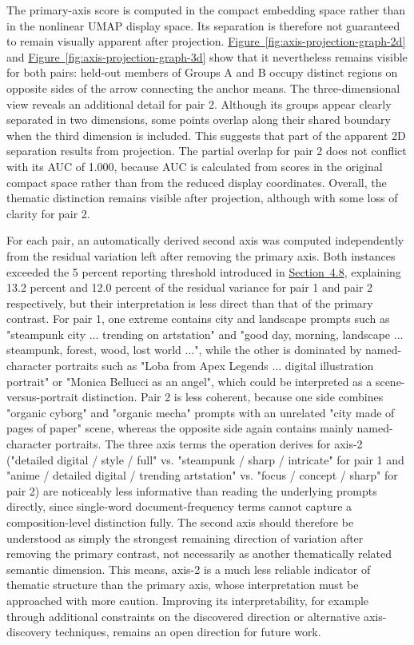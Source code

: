 The primary-axis score is computed in the compact embedding space rather than in the nonlinear UMAP display space. Its separation is therefore not guaranteed to remain visually apparent after projection. \hyperref[fig:axis-projection-graph-2d]{Figure~\ref*{fig:axis-projection-graph-2d}} and \hyperref[fig:axis-projection-graph-3d]{Figure~\ref*{fig:axis-projection-graph-3d}} show that it nevertheless remains visible for both pairs: held-out members of Groups A and B occupy distinct regions on opposite sides of the arrow connecting the anchor means. The three-dimensional view reveals an additional detail for pair 2. Although its groups appear clearly separated in two dimensions, some points overlap along their shared boundary when the third dimension is included. This suggests that part of the apparent 2D separation results from projection. The partial overlap for pair 2 does not conflict with its AUC of 1.000, because AUC is calculated from scores in the original compact space rather than from the reduced display coordinates. Overall, the thematic distinction remains visible after projection, although with some loss of clarity for pair 2.

For each pair, an automatically derived second axis was computed independently from the residual variation left after removing the primary axis. Both instances exceeded the 5 percent reporting threshold introduced in \hyperref[sec:4.8]{Section~4.8}, explaining 13.2 percent and 12.0 percent of the residual variance for pair 1 and pair 2 respectively, but their interpretation is less direct than that of the primary contrast. For pair 1, one extreme contains city and landscape prompts such as "steampunk city ... trending on artstation" and "good day, morning, landscape ... steampunk, forest, wood, lost world ...", while the other is dominated by named-character portraits such as "Loba from Apex Legends ... digital illustration portrait" or "Monica Bellucci as an angel", which could be interpreted as a scene-versus-portrait distinction. Pair 2 is less coherent, because one side combines "organic cyborg" and "organic mecha" prompts with an unrelated "city made of pages of paper" scene, whereas the opposite side again contains mainly named-character portraits. The three axis terms the operation derives for axis-2 ("detailed digital / style / full" vs. "steampunk / sharp / intricate" for pair 1 and "anime / detailed digital / trending artstation" vs. "focus / concept / sharp" for pair 2) are noticeably less informative than reading the underlying prompts directly, since single-word document-frequency terms cannot capture a composition-level distinction fully. The second axis should therefore be understood as simply the strongest remaining direction of variation after removing the primary contrast, not necessarily as another thematically related semantic dimension. This means, axis-2 is a much less reliable indicator of thematic structure than the primary axis, whose interpretation must be approached with more caution. Improving its interpretability, for example through additional constraints on the discovered direction or alternative axis-discovery techniques, remains an open direction for future work.

